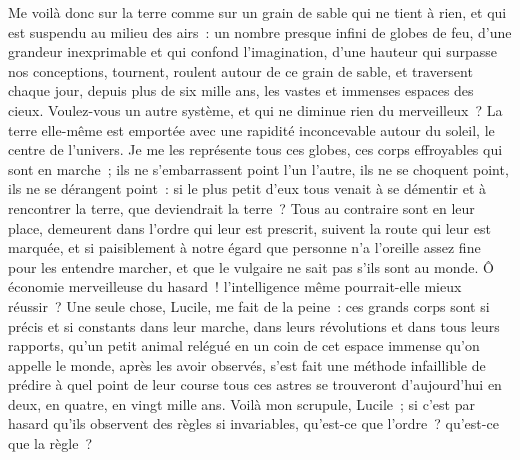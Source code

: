 \documentclass[french,twoside]{book} %
\begin{document}
Me voilà donc sur la terre comme sur un grain de sable qui ne tient à rien, et qui est suspendu au milieu des airs : un nombre presque infini de globes de feu, d’une grandeur inexprimable et qui confond l’imagination, d’une hauteur qui surpasse nos conceptions, tournent, roulent autour de ce grain de sable, et traversent chaque jour, depuis plus de six mille ans, les vastes et immenses espaces des cieux. Voulez-vous un autre système, et qui ne diminue rien du merveilleux ? La terre elle-même est emportée avec une rapidité inconcevable autour du soleil, le centre de l’univers. Je me les représente tous ces globes, ces corps effroyables qui sont en marche ; ils ne s’embarrassent point l’un l’autre, ils ne se choquent point, ils ne se dérangent point : si le plus petit d’eux tous venait à se démentir et à rencontrer la terre, que deviendrait la terre ? Tous au contraire sont en leur place, demeurent dans l’ordre qui leur est prescrit, suivent la route qui leur est marquée, et si paisiblement à notre égard que personne n’a l’oreille assez fine pour les entendre marcher, et que le vulgaire ne sait pas s’ils sont au monde. Ô économie merveilleuse du hasard ! l’intelligence même pourrait-elle mieux réussir ? Une seule chose, Lucile, me fait de la peine : ces grands corps sont si précis et si constants dans leur marche, dans leurs révolutions et dans tous leurs rapports, qu’un petit animal relégué en un coin de cet espace immense qu’on appelle le monde, après les avoir observés, s’est fait une méthode infaillible de prédire à quel point de leur course tous ces astres se trouveront d’aujourd’hui en deux, en quatre, en vingt mille ans. Voilà mon scrupule, Lucile ; si c’est par hasard qu’ils observent des règles si invariables, qu’est-ce que l’ordre ? qu’est-ce que la règle ?\par
\end{document}
